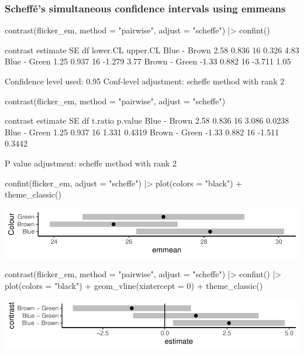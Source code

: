 \documentclass[a4paper]{article}\usepackage[]{graphicx}\usepackage[]{xcolor}
\makeatletter
\def\maxwidth{ %
  \ifdim\Gin@nat@width>\linewidth
    \linewidth
  \else
    \Gin@nat@width
  \fi
}
\makeatother
\begin{document}
\subsubsection{Scheffé's simultaneous confidence intervals using emmeans}
\begin{Schunk}
\begin{Sinput}
contrast(flicker_em, method = "pairwise", adjust = "scheffe") |> confint()
\end{Sinput}
\begin{Soutput}
 contrast      estimate    SE df lower.CL upper.CL
 Blue - Brown      2.58 0.836 16    0.326     4.83
 Blue - Green      1.25 0.937 16   -1.279     3.77
 Brown - Green    -1.33 0.882 16   -3.711     1.05

Confidence level used: 0.95 
Conf-level adjustment: scheffe method with rank 2 
\end{Soutput}
\begin{Sinput}
contrast(flicker_em, method = "pairwise", adjust = "scheffe")
\end{Sinput}
\begin{Soutput}
 contrast      estimate    SE df t.ratio p.value
 Blue - Brown      2.58 0.836 16   3.086  0.0238
 Blue - Green      1.25 0.937 16   1.331  0.4319
 Brown - Green    -1.33 0.882 16  -1.511  0.3442

P value adjustment: scheffe method with rank 2 
\end{Soutput}
\begin{Sinput}
confint(flicker_em, adjust = "scheffe") |> plot(colors = "black") + theme_classic()
\end{Sinput}


{\centering \includegraphics[width=\maxwidth]{figure/listings-unnamed-chunk-256-1} 

}

\begin{Sinput}
contrast(flicker_em, method = "pairwise", adjust = "scheffe") |> confint() |> plot(colors = "black") + 
   geom_vline(xintercept = 0) + theme_classic()
\end{Sinput}


{\centering \includegraphics[width=\maxwidth]{figure/listings-unnamed-chunk-256-2} 

}

\end{Schunk}
\end{document}
